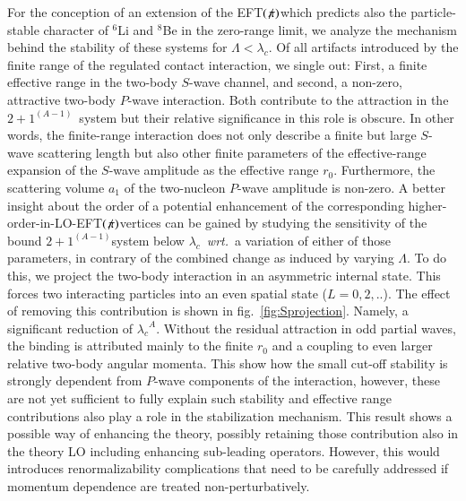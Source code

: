 \documentclass[preprint,12pt]{elsarticle}
\newcommand{\lc}{\ensuremath{\lambda_c}}
\newcommand{\abb}{\ensuremath{2\!+\!1^{(A-1)}}}
\newcommand{\wrt}{\textit{wrt.}~}
\newcommand{\eftnopi}{\mbox{EFT$(\not \! \pi)$}}
\newcommand{\figref}[1]{fig.~\ref{#1}}
\begin{document}
For the conception of an extension of the \eftnopi which predicts also the particle-stable character of $^6$Li and $^8$Be in the zero-range limit, we analyze the mechanism behind the stability of these systems for $\Lambda<\lc$. 
Of all artifacts introduced by the finite range of the regulated contact interaction, we single out: First, a finite effective range in the two-body $S$-wave channel, and second, a non-zero, attractive two-body $P$-wave interaction. 
Both contribute to the attraction in the \abb~system but their relative significance in this role is obscure.
In other words, the finite-range interaction does not only describe a finite but large $S$-wave scattering length but also other finite parameters of the effective-range expansion of the $S$-wave amplitude as the effective range $r_0$. 
Furthermore, the scattering volume $a_1$ of the two-nucleon $P$-wave amplitude is non-zero.
A better insight about the order of a potential enhancement of the corresponding higher-order-in-LO-\eftnopi vertices can be gained by studying the sensitivity of the bound \abb system below \lc~\wrt a variation of either of those parameters, in contrary of the combined change as induced by varying $\Lambda$.
To do this, we project the two-body interaction in an asymmetric internal state.
This forces two interacting particles into an even spatial state ($L=0,2,..$). 
The effect of removing this contribution is shown in \figref{fig:Sprojection}. 
Namely, a significant reduction of $\lc^A$. 
Without the residual attraction in odd partial waves, the binding is attributed mainly to the finite $r_0$ and a coupling to even larger relative two-body angular momenta.
This show how the small cut-off stability is strongly dependent from $P$-wave components of the interaction, however, these are not yet sufficient to fully explain such stability and effective range contributions also play a role in the stabilization mechanism.
This result shows a possible way of enhancing the theory, possibly retaining those contribution also in the theory LO including enhancing sub-leading operators.
However, this would introduces renormalizability complications that need to be carefully addressed if momentum dependence are treated non-perturbatively. 
\end{document}
